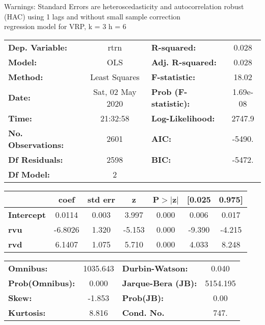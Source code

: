 Warnings: \newline
 [1] Standard Errors are heteroscedasticity and autocorrelation robust (HAC) using 1 lags and without small sample correction\\ 

regression model for VRP, k = 3 h = 6\begin{center}
\begin{tabular}{lclc}
\toprule
\textbf{Dep. Variable:}    &       rtrn       & \textbf{  R-squared:         } &     0.028   \\
\textbf{Model:}            &       OLS        & \textbf{  Adj. R-squared:    } &     0.028   \\
\textbf{Method:}           &  Least Squares   & \textbf{  F-statistic:       } &     18.02   \\
\textbf{Date:}             & Sat, 02 May 2020 & \textbf{  Prob (F-statistic):} &  1.69e-08   \\
\textbf{Time:}             &     21:32:58     & \textbf{  Log-Likelihood:    } &    2747.9   \\
\textbf{No. Observations:} &        2601      & \textbf{  AIC:               } &    -5490.   \\
\textbf{Df Residuals:}     &        2598      & \textbf{  BIC:               } &    -5472.   \\
\textbf{Df Model:}         &           2      & \textbf{                     } &             \\
\bottomrule
\end{tabular}
\begin{tabular}{lcccccc}
                   & \textbf{coef} & \textbf{std err} & \textbf{z} & \textbf{P$> |$z$|$} & \textbf{[0.025} & \textbf{0.975]}  \\
\midrule
\textbf{Intercept} &       0.0114  &        0.003     &     3.997  &         0.000        &        0.006    &        0.017     \\
\textbf{rvu}       &      -6.8026  &        1.320     &    -5.153  &         0.000        &       -9.390    &       -4.215     \\
\textbf{rvd}       &       6.1407  &        1.075     &     5.710  &         0.000        &        4.033    &        8.248     \\
\bottomrule
\end{tabular}
\begin{tabular}{lclc}
\textbf{Omnibus:}       & 1035.643 & \textbf{  Durbin-Watson:     } &    0.040  \\
\textbf{Prob(Omnibus):} &   0.000  & \textbf{  Jarque-Bera (JB):  } & 5154.195  \\
\textbf{Skew:}          &  -1.853  & \textbf{  Prob(JB):          } &     0.00  \\
\textbf{Kurtosis:}      &   8.816  & \textbf{  Cond. No.          } &     747.  \\
\bottomrule
\end{tabular}
\end{center}


